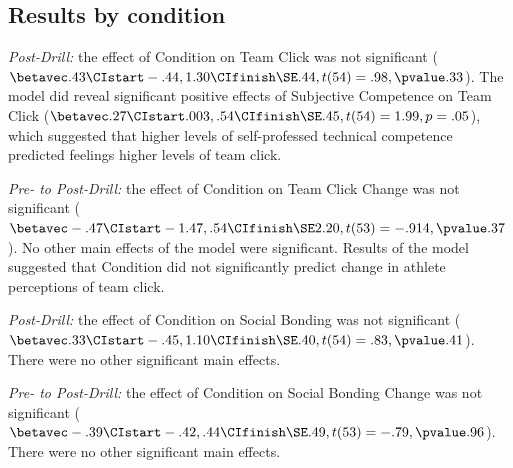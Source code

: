 





\subsection{Results by condition}

\textit{Post-Drill:} the effect of Condition on Team Click was not significant ($\betavec .43 \CIstart -.44, 1.30 \CIfinish \SE .44, t(54)= .98, \pvalue .33$). The model did reveal significant positive effects of Subjective Competence on Team Click ($\betavec .27  \CIstart .003, .54 \CIfinish \SE .45, t(54)= 1.99, p = .05$), which suggested that higher levels of self-professed technical competence predicted feelings higher levels of team click.

\textit{Pre- to Post-Drill:} the effect of Condition on Team Click Change was not significant ($\betavec -.47 \CIstart -1.47, .54 \CIfinish \SE 2.20, t(53)= -.914, \pvalue .37$). No other main effects of the model were significant.  Results of the model suggested that Condition did not significantly predict change in athlete perceptions of team click.


\textit{Post-Drill:} the effect of Condition on Social Bonding was not significant ($\betavec .33 \CIstart -.45, 1.10 \CIfinish \SE .40, t(54)= .83, \pvalue .41$). There were no other significant main effects.

\textit{Pre- to Post-Drill:} the effect of Condition on Social Bonding Change was not significant ($\betavec -.39 \CIstart -.42, .44 \CIfinish \SE .49, t(53)= -.79, \pvalue .96$). There were no other significant main effects.

